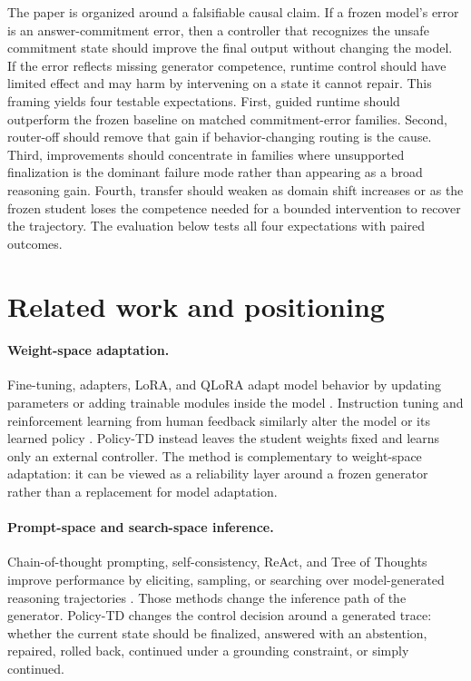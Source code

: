 \documentclass[11pt]{article}
\newcommand{\policytd}{Policy-TD}
\begin{document}
The paper is organized around a falsifiable causal claim. If a frozen model's error is an answer-commitment error, then a controller that recognizes the unsafe commitment state should improve the final output without changing the model. If the error reflects missing generator competence, runtime control should have limited effect and may harm by intervening on a state it cannot repair. This framing yields four testable expectations. First, guided runtime should outperform the frozen baseline on matched commitment-error families. Second, router-off should remove that gain if behavior-changing routing is the cause. Third, improvements should concentrate in families where unsupported finalization is the dominant failure mode rather than appearing as a broad reasoning gain. Fourth, transfer should weaken as domain shift increases or as the frozen student loses the competence needed for a bounded intervention to recover the trajectory. The evaluation below tests all four expectations with paired outcomes.

\section{Related work and positioning}
\paragraph{Weight-space adaptation.} Fine-tuning, adapters, LoRA, and QLoRA adapt model behavior by updating parameters or adding trainable modules inside the model \cite{hu2021lora,dettmers2023qlora}. Instruction tuning and reinforcement learning from human feedback similarly alter the model or its learned policy \cite{ouyang2022training}. \policytd{} instead leaves the student weights fixed and learns only an external controller. The method is complementary to weight-space adaptation: it can be viewed as a reliability layer around a frozen generator rather than a replacement for model adaptation.

\paragraph{Prompt-space and search-space inference.} Chain-of-thought prompting, self-consistency, ReAct, and Tree of Thoughts improve performance by eliciting, sampling, or searching over model-generated reasoning trajectories \cite{wei2022chain,wang2022selfconsistency,yao2022react,yao2023tree}. Those methods change the inference path of the generator. \policytd{} changes the control decision around a generated trace: whether the current state should be finalized, answered with an abstention, repaired, rolled back, continued under a grounding constraint, or simply continued.
\end{document}
